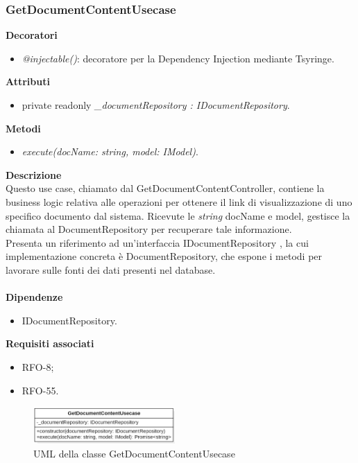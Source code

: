 \subsubsection{GetDocumentContentUsecase}
\textbf{Decoratori}
\begin{itemize}
    \item \textit{@injectable()}: decoratore per la Dependency Injection mediante Tsyringe.
\end{itemize}
\textbf{Attributi}
\begin{itemize}
    \item private readonly \textit{\_documentRepository : IDocumentRepository}.
\end{itemize}
\textbf{Metodi}
\begin{itemize}
    \item \textit{execute(docName: string, model: IModel)}.
\end{itemize}
\textbf{Descrizione}\\
Questo use case, chiamato dal GetDocumentContentController, contiene la business logic relativa alle operazioni per ottenere il link di visualizzazione di uno specifico documento dal sistema. Ricevute le \textit{string} docName e model, gestisce la chiamata al DocumentRepository per recuperare tale informazione.\\
Presenta un riferimento ad un'interfaccia IDocumentRepository , la cui implementazione concreta è DocumentRepository, che espone i metodi per lavorare sulle fonti dei dati presenti nel database.\\ \\
\textbf{Dipendenze}
\begin{itemize}
    \item IDocumentRepository.
\end{itemize}
\textbf{Requisiti associati}
\begin{itemize}[itemsep=-4pt]
    \item RFO-8;
    \item RFO-55.
\end{itemize}

\begin{figure}[h!]
    \centering  
    \includegraphics[width=0.48\textwidth]{GetDocumentContentUsecase.png} %
    \caption{UML della classe GetDocumentContentUsecase}
\end{figure}

